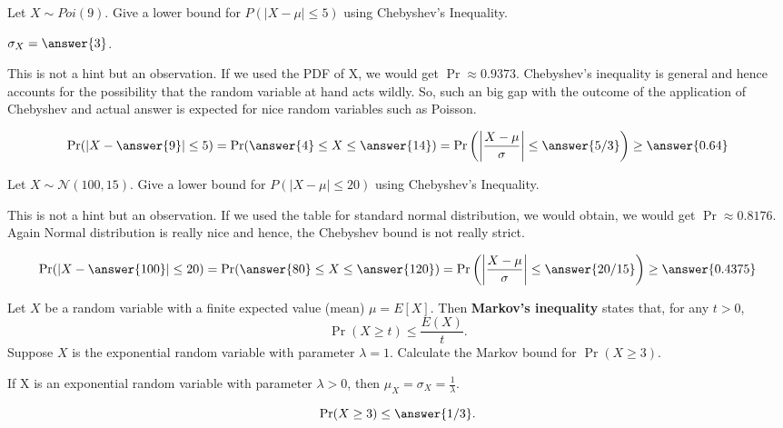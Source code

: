 \documentclass{ximera}
\begin{document}
\begin{problem}
 Let $X \sim Poi(9)$. Give a lower bound for $P( |X -\mu| \leq 5)$ using Chebyshev's Inequality.
\begin{hint}
\item $\sigma_X=\answer{3}$.
\item This is not a hint but an observation. If we used the PDF of X, we would get $\Pr\approx 0.9373$. Chebyshev's inequality is general and hence accounts for the possibility that the random variable at hand acts wildly. So, such an big gap with the outcome of the application of Chebyshev and actual answer is expected for nice random variables such as Poisson. 
\end{hint}
\begin{prompt}
$$\Pr( |X -\answer{9}| \leq 5)=\Pr(\answer{4} \leq X \leq \answer{14})=\Pr\left(\left|\frac{X-\mu}{\sigma}\right| \leq \answer{5/3}\right)\geq \answer{0.64}$$
\end{prompt}
\end{problem}


\begin{problem}
 Let $X \sim \mathcal N (100,15) $. Give a lower bound for $P( |X -\mu| \leq 20)$ using Chebyshev's Inequality.
\begin{hint}
This is not a hint but an observation. If we used the table for standard normal distribution, we would obtain, we would get $\Pr\approx 0.8176$. Again Normal distribution is really nice and hence, the Chebyshev bound is not really strict.
\end{hint}
\begin{prompt}
$$\Pr( |X -\answer{100}| \leq 20)=\Pr(\answer{80} \leq X \leq \answer{120})=\Pr\left(\left|\frac{X-\mu}{\sigma}\right| \leq \answer{20/15}\right)\geq \answer{0.4375}$$
\end{prompt}
\end{problem}

\begin{problem}
Let $X$ be a random variable with a finite expected value (mean) $\mu=E[X]$. Then {\bf Markov's inequality} states that, for any $t>0$, 
$$\Pr(X\geq t)\leq \frac{E(X)}{t}.$$ Suppose $X$ is the exponential random variable with parameter $\lambda=1$. Calculate the Markov bound for $\Pr(X\geq 3)$. 
\begin{hint}
If X is an exponential random variable with parameter $\lambda>0$, then $\mu_X=\sigma_X=\frac{1}{\lambda}$.
\end{hint}
\begin{prompt}%
$$\Pr(X\geq 3)\leq \answer{1/3}.$$

\end{prompt}
\end{problem}
\end{document}
